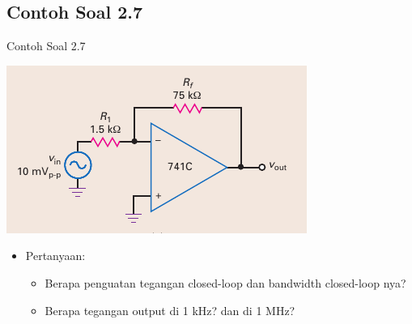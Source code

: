 \subsection{Contoh Soal 2.7}
\begin{frame}{Contoh Soal 2.7}
	\begin{multicols}{2}
		\begin{center}
			\includegraphics[width=\linewidth]{gambar/fig-16.16a}
		\end{center}
		\columnbreak
		\begin{itemize}
			\item Pertanyaan:
			\begin{itemize}
				\item Berapa penguatan tegangan closed-loop dan bandwidth closed-loop nya?
				\item Berapa tegangan output di 1 kHz? dan di 1 MHz?
			\end{itemize}
		\end{itemize}
	\end{multicols}
\end{frame}

